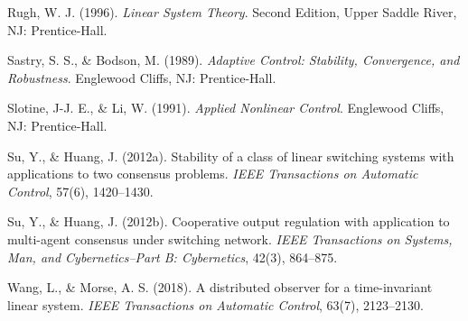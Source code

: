 \documentclass[twocolumn]{autart}
\begin{document}
\begin{thebibliography}{99}
 Rugh, W. J. (1996).
\newblock  \emph{Linear System Theory}.
\newblock  Second Edition, Upper Saddle River, NJ: Prentice-Hall.


Sastry, S. S., \&  Bodson, M. (1989).
\newblock  \emph{Adaptive Control: Stability, Convergence, and Robustness}.
\newblock  Englewood Cliffs, NJ: Prentice-Hall.





Slotine, J-J. E., \&  Li, W. (1991).
\newblock \emph{Applied Nonlinear Control}.
\newblock Englewood Cliffs, NJ: Prentice-Hall.



Su, Y., \& Huang, J. (2012a).
\newblock Stability of a class of linear switching systems with applications to two consensus problems.
\newblock \emph{IEEE Transactions on Automatic Control}, 57(6), 1420--1430.




Su, Y., \& Huang, J. (2012b).
\newblock Cooperative output regulation with application to multi-agent consensus under switching network.
\newblock \emph{IEEE Transactions on Systems, Man, and Cybernetics--Part B: Cybernetics}, 42(3), 864--875.





Wang, L., \&  Morse,  A. S. (2018).
\newblock A distributed observer for a time-invariant linear system.
\newblock \emph{IEEE Transactions on Automatic Control}, 63(7),  2123--2130.





\end{thebibliography}
\end{document}

